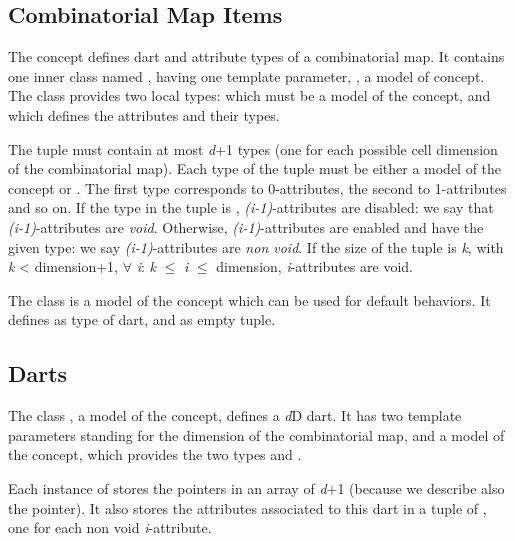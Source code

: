 \subsection{Combinatorial Map Items}\label{ssec-item}

The  concept defines dart and attribute
types of a combinatorial map. It contains one inner class named
, having one template parameter, , a model
of  concept.  The  class
provides two local types:  which must be a model of the
 concept, and  which defines the attributes
and their types.

The  tuple must contain at most \emph{d}+1 types (one for
each possible cell dimension of the combinatorial map).  Each type of
the tuple must be either a model of the  concept or
.  The first type corresponds to 0-attributes, the second to
1-attributes and so on. If the  type in the tuple is  
, \emph{(i-1)}-attributes are disabled: we say that
\emph{(i-1)}-attributes are \emph{void}.  Otherwise, \emph{(i-1)}-attributes are
enabled and have the given type: we say \emph{(i-1)}-attributes are
\emph{non void}.  If the size of the tuple is \emph{k}, with \emph{k} <
dimension+1, $\forall$ \emph{i}: \emph{k} $\leq$ \emph{i} $\leq$ dimension, \emph{i}-attributes are
void.

The class  is a model of the
 concept which can be used for default behaviors.
It defines  as type of dart, and
 as empty tuple.

\subsection{Darts}\label{ssec-darts}

The class , a model of the  concept,
defines a \emph{d}D dart. It has two template parameters standing for the
dimension of the combinatorial map, and a model of the
 concept, which provides the two types
 and . 

Each instance  of  stores the \betai{} pointers in an
array of \emph{d}+1  (because we describe also the
\betazero{} pointer).  It also stores the attributes associated to this
dart in a tuple of , one for each
non void \emph{i}-attribute.

